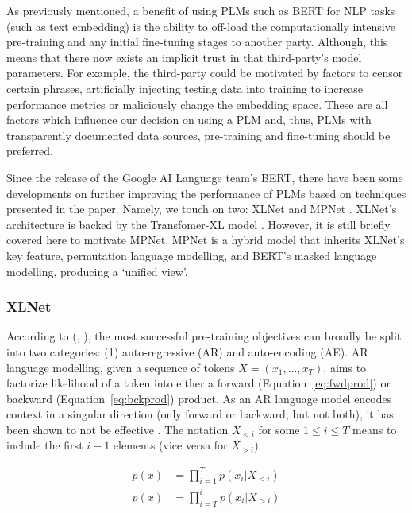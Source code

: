 \documentclass[10pt,oneside]{report}
\renewcommand{\citet}[1]{\citeauthor{#1}, \citeyear{#1}}
\begin{document}
As previously mentioned, a benefit of using PLMs such as BERT for NLP tasks (such as text embedding) is the ability to off-load the computationally intensive pre-training and any initial fine-tuning stages to another party. Although, this means that there now exists an implicit trust in that third-party's model parameters. For example, the third-party could be motivated by factors to censor certain phrases, artificially injecting testing data into training to increase performance metrics or maliciously change the embedding space. These are all factors which influence our decision on using a PLM and, thus, PLMs with transparently documented data sources, pre-training and fine-tuning should be preferred.

Since the release of the Google AI Language team's BERT, there have been some developments on further improving the performance of PLMs based on techniques presented in the paper. Namely, we touch on two: XLNet \cite{yang2019xlnet} and MPNet \cite{song2020mpnet}. 
XLNet's architecture is backed by the Transfomer-XL model \cite{dai2019transformer}. However, it is still briefly covered here to motivate MPNet. MPNet is a hybrid model that inherits XLNet's key feature, permutation language modelling, and BERT's masked language modelling, producing a `unified view'.

\subsubsection{XLNet}\label{sec:xlnet}

According to (\citet{yang2019xlnet}), the most successful pre-training objectives can broadly be split into two categories: (1) auto-regressive (AR) and auto-encoding (AE). AR language modelling, given a sequence of tokens $X = (x_1, ..., x_T)$, aims to factorize likelihood of a token into either a forward (Equation~\ref{eq:fwdprod}) or backward (Equation~\ref{eq:bckprod}) product. As an AR language model encodes context in a singular direction (only forward or backward, but not both), it has been shown to not be effective \cite{yang2019xlnet}. The notation $X_{<i}$ for some $1 \le i \le T$ means to include the first $i - 1$ elements (vice versa for $X_{>i}$).

\begin{align}
    p(x) &= \prod_{i=1}^{T} p(x_i | X_{<i})
    \label{eq:fwdprod} \\
    p(x) &= \prod_{i=T}^{i} p(x_i | X_{>i})
    \label{eq:bckprod}
\end{align}
\end{document}

